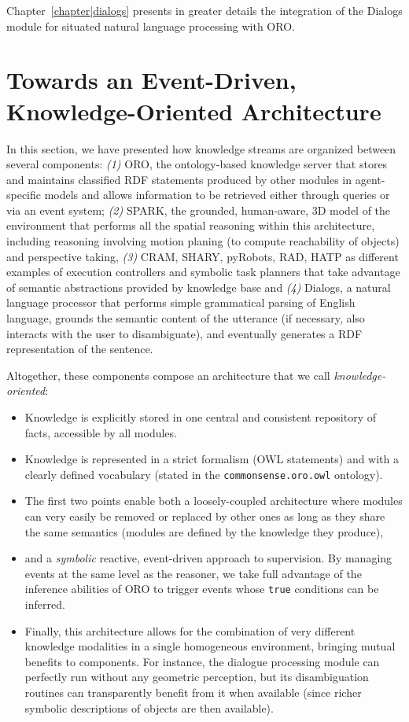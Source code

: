 Chapter~\ref{chapter|dialogs} presents in greater details the integration of
the {\sc Dialogs} module for situated natural language processing with ORO.


\section{Towards an Event-Driven, Knowledge-Oriented Architecture}

In this section, we have presented how knowledge streams are organized between
several components: {\it(1)} {\sc ORO}, the ontology-based knowledge server
that stores and maintains classified RDF statements produced by other modules
in agent-specific models and allows information to be retrieved either through
queries or via an event system; {\it(2)} {\sc SPARK}, the grounded,
human-aware, 3D model of the environment that performs all the spatial
reasoning within this architecture, including reasoning involving motion
planing (to compute reachability of objects) and perspective taking, {\it(3)}
{\sc CRAM}, {\sc SHARY}, {\sc pyRobots}, {\sc RAD}, {\sc HATP} as different
examples of execution controllers and symbolic task planners that take
advantage of semantic abstractions provided by knowledge base and {\it(4)} {\sc
Dialogs}, a natural language processor that performs simple grammatical parsing
of English language, grounds the semantic content of the utterance (if
necessary, also interacts with the user to disambiguate), and eventually
generates a RDF representation of the sentence.

Altogether, these components compose an architecture that we call
\emph{knowledge-oriented}:

\begin{itemize} \item{Knowledge is explicitly stored in one central and
consistent repository of facts, accessible by all modules.} \item{Knowledge is
represented in a strict formalism (OWL statements) and with a clearly defined
vocabulary (stated in the {\tt commonsense.oro.owl} ontology).} \item{The first
two points enable both a loosely-coupled architecture where modules can very
easily be removed or replaced by other ones as long as they share the same
semantics (modules are defined by the knowledge they produce),} \item{and a
\emph{symbolic} reactive, event-driven approach to supervision. By managing
events at the same level as the reasoner, we take full advantage of the
inference abilities of ORO to trigger events whose \texttt{true} conditions can
be inferred.} \item{Finally, this architecture allows for the combination of
very different knowledge modalities in a single homogeneous environment,
bringing mutual benefits to components. For instance, the dialogue processing
module can perfectly run without any geometric perception, but its
disambiguation routines can transparently benefit from it when available (since
richer symbolic descriptions of objects are then available).} \end{itemize}

